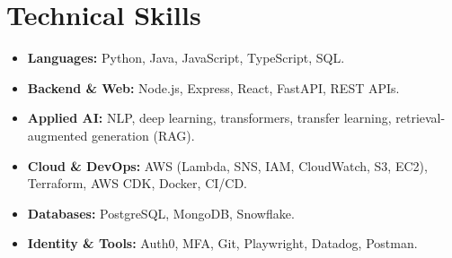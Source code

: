 \documentclass[letterpaper,10pt]{article}
\begin{document}

\section{Technical Skills}
\begin{itemize}[leftmargin=0.15in, itemsep=0pt, topsep=0pt]
    \item \footnotesize \textbf{Languages:} Python, Java, JavaScript, TypeScript, SQL.
    \item \footnotesize \textbf{Backend \& Web:} Node.js, Express, React, FastAPI, REST APIs.
    \item \footnotesize \textbf{Applied AI:} NLP, deep learning, transformers, transfer learning, retrieval-augmented generation (RAG).
    \item \footnotesize \textbf{Cloud \& DevOps:} AWS (Lambda, SNS, IAM, CloudWatch, S3, EC2), Terraform, AWS CDK, Docker, CI/CD.
    \item \footnotesize \textbf{Databases:} PostgreSQL, MongoDB, Snowflake.
    \item \footnotesize \textbf{Identity \& Tools:} Auth0, MFA, Git, Playwright, Datadog, Postman.
\end{itemize}
\vspace{-.5em}
\end{document}
